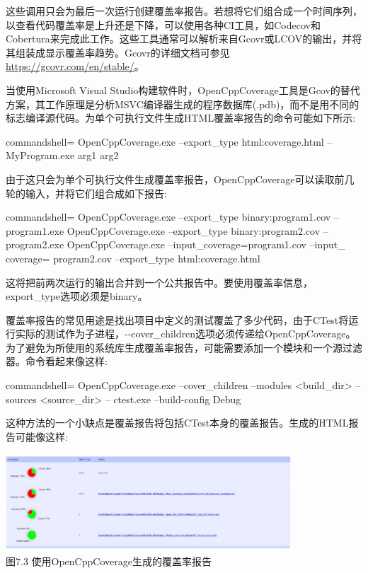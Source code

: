 这些调用只会为最后一次运行创建覆盖率报告。若想将它们组合成一个时间序列，以查看代码覆盖率是上升还是下降，可以使用各种CI工具，如Codecov和Cobertura来完成此工作。这些工具通常可以解析来自Gcovr或LCOV的输出，并将其组装成显示覆盖率趋势。Gcovr的详细文档可参见\url{https://gcovr.com/en/stable/}。


当使用Microsoft Visual Studio构建软件时，OpenCppCoverage工具是Gcov的替代方案，其工作原理是分析MSVC编译器生成的程序数据库(.pdb)，而不是用不同的标志编译源代码。为单个可执行文件生成HTML覆盖率报告的命令可能如下所示:

\begin{tcblisting}{commandshell={}}
OpenCppCoverage.exe --export_type html:coverage.html --
  MyProgram.exe arg1 arg2
\end{tcblisting}

由于这只会为单个可执行文件生成覆盖率报告，OpenCppCoverage可以读取前几轮的输入，并将它们组合成如下报告:

\begin{tcblisting}{commandshell={}}
OpenCppCoverage.exe --export_type binary:program1.cov --
  program1.exe
OpenCppCoverage.exe --export_type binary:program2.cov --
  program2.exe
OpenCppCoverage.exe --input_coverage=program1.cov --input_
coverage= program2.cov --export_type html:coverage.html
\end{tcblisting}

这将把前两次运行的输出合并到一个公共报告中。要使用覆盖率信息，export\_type选项必须是binary。

覆盖率报告的常见用途是找出项目中定义的测试覆盖了多少代码，由于CTest将运行实际的测试作为子进程，-{}-cover\_children选项必须传递给OpenCppCoverage。为了避免为所使用的系统库生成覆盖率报告，可能需要添加一个模块和一个源过滤器。命令看起来像这样:

\begin{tcblisting}{commandshell={}}
OpenCppCoverage.exe --cover_children --modules <build_dir> --
  sources <source_dir> -- ctest.exe --build-config Debug
\end{tcblisting}

这种方法的一个小缺点是覆盖报告将包括CTest本身的覆盖报告。生成的HTML报告可能像这样:

\begin{center}
\includegraphics[width=0.8\textwidth]{content/2/chapter7/images/3.jpg}\\
图7.3 使用OpenCppCoverage生成的覆盖率报告
\end{center}

